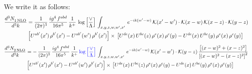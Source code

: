 \documentclass[9pt]{article}
\numberwithin{equation}{section}
\begin{document}
We write it as follows: 
\begin{align}
   \frac{d^{3}N_{1\,\rm NLO}^{\rm}}{d^{3}k}  & = \frac{1}{(2\pi)^{3}}\,\frac{ig^{4}\,f^{abd}}{16\pi^{5}}\,\frac{1}{k^{+}}\,\log{\left[\frac{\vee}{\Lambda}\right]}\,\int_{x,y,z,w,w',x'}\,e^{-ik(w^\prime-w)}\, \mathcal{K}(x'-w')\cdot \mathcal{K}(x-w)\, \mathcal{K}(x-z)\cdot \mathcal{K}(y-z) \notag \\ & \left[U^{ab'}(x')\,\rho^{b'}(x')-U^{ab'}(w')\, \rho^{b'}(x')\right]\times\, \left[U^{de}(x)\,U^{bc}(z)\, \rho^{e}(x)\,\rho^{c}(y)-U^{de}(x)\,U^{bc}(y)\,\rho^{e}(x)\,\rho^{c}(y)\right]
\end{align}
\begin{align}
   \frac{d^{3}N_{2\,\rm NLO}^{\rm}}{d^{3}k}  & = -\,\frac{1}{(2\pi)^{3}}\, \frac{ig^{4}\, f^{abd}}{16\pi^{5}}\, \frac{1}{k^{+}}\,{\color{blue}\log{\left[\frac{\vee}{\Lambda}\right]}}\, \int_{x,y,z,w,w',x'}\,e^{-ik(w^\prime-w)}\, \mathcal{K}(x'-w')\cdot \mathcal{K}(y-z)\, \frac{\left[(x-w)^{2}+(x-z)^{2}\right]}{\left[(x-w)^{2}-(x-z)^{2}\right]^{2}} \notag \\ & \left[U^{ab'}(x')\,\rho^{b'}(x')-U^{ab'}(w')\, \rho^{b'}(x')\right]\times\,\left[U^{de}(x)\,U^{bc}(z)\, \rho^{e}(x)\,\rho^{c}(y)-U^{de}(x)\,U^{bc}(y)\,\rho^{e}(x)\,\rho^{c}(y)\right] 
\end{align}
\end{document}
